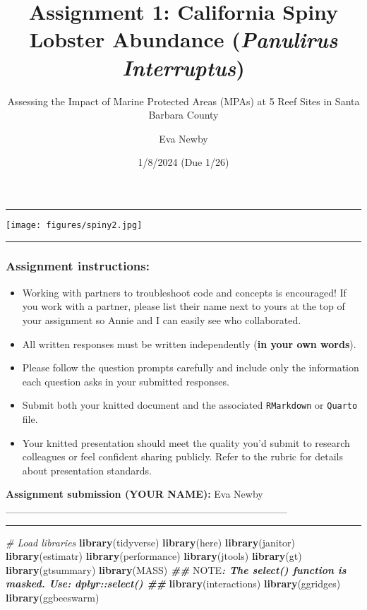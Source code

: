 \documentclass[
]{article}
\title{Assignment 1: California Spiny Lobster Abundance (\emph{Panulirus
Interruptus})}
\subtitle{Assessing the Impact of Marine Protected Areas (MPAs) at 5
Reef Sites in Santa Barbara County}
\author{Eva Newby}
\date{1/8/2024 (Due 1/26)}
\newenvironment{Shaded}{\begin{snugshade}}{\end{snugshade}}
\newcommand{\AlertTok}[1]{\textcolor[rgb]{0.94,0.16,0.16}{#1}}
\newcommand{\CommentTok}[1]{\textcolor[rgb]{0.56,0.35,0.01}{\textit{#1}}}
\newcommand{\DocumentationTok}[1]{\textcolor[rgb]{0.56,0.35,0.01}{\textbf{\textit{#1}}}}
\newcommand{\FunctionTok}[1]{\textcolor[rgb]{0.13,0.29,0.53}{\textbf{#1}}}
\newcommand{\NormalTok}[1]{#1}
\begin{document}
\maketitle

\begin{center}\rule{0.5\linewidth}{0.5pt}\end{center}

\texttt{[image: figures/spiny2.jpg]}

\begin{center}\rule{0.5\linewidth}{0.5pt}\end{center}

\subsubsection{Assignment instructions:}\label{assignment-instructions}

\begin{itemize}
\item
  Working with partners to troubleshoot code and concepts is encouraged!
  If you work with a partner, please list their name next to yours at
  the top of your assignment so Annie and I can easily see who
  collaborated.
\item
  All written responses must be written independently (\textbf{in your
  own words}).
\item
  Please follow the question prompts carefully and include only the
  information each question asks in your submitted responses.
\item
  Submit both your knitted document and the associated
  \texttt{RMarkdown} or \texttt{Quarto} file.
\item
  Your knitted presentation should meet the quality you'd submit to
  research colleagues or feel confident sharing publicly. Refer to the
  rubric for details about presentation standards.
\end{itemize}

\textbf{Assignment submission (YOUR NAME):} Eva Newby
\_\_\_\_\_\_\_\_\_\_\_\_\_\_\_\_\_\_\_\_\_\_\_\_\_\_\_\_\_\_\_\_\_\_\_\_\_\_

\begin{center}\rule{0.5\linewidth}{0.5pt}\end{center}

\begin{Shaded}
\begin{Highlighting}[]
\CommentTok{\# Load libraries}
\FunctionTok{library}\NormalTok{(tidyverse)}
\FunctionTok{library}\NormalTok{(here)}
\FunctionTok{library}\NormalTok{(janitor)}
\FunctionTok{library}\NormalTok{(estimatr)  }
\FunctionTok{library}\NormalTok{(performance)}
\FunctionTok{library}\NormalTok{(jtools)}
\FunctionTok{library}\NormalTok{(gt)}
\FunctionTok{library}\NormalTok{(gtsummary)}
\FunctionTok{library}\NormalTok{(MASS) }\DocumentationTok{\#\# }\AlertTok{NOTE}\DocumentationTok{: The \textasciigrave{}select()\textasciigrave{} function is masked. Use: \textasciigrave{}dplyr::select()\textasciigrave{} \#\#}
\FunctionTok{library}\NormalTok{(interactions) }
\FunctionTok{library}\NormalTok{(ggridges)}
\FunctionTok{library}\NormalTok{(ggbeeswarm)}
\end{Highlighting}
\end{Shaded}
\end{document}
